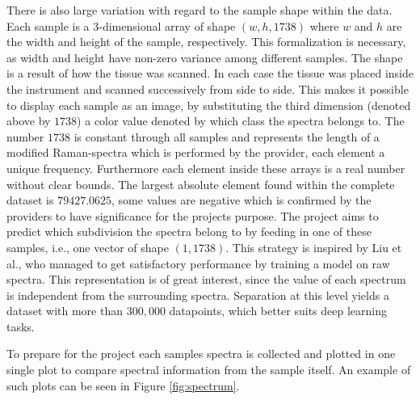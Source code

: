 There is also large variation with regard to the sample shape within the data. Each sample is a 3-dimensional array of shape $(w, h, 1738)$ where $w$ and $h$ are the width and height of the sample, respectively. This formalization is necessary, as width and height have non-zero variance among different samples. The shape is a result of how the tissue was scanned. In each case the tissue was placed inside the instrument and scanned successively from side to side. This makes it possible to display each sample as an image, by substituting the third dimension (denoted above by $1738$) a color value denoted by which class the spectra belongs to. The number $1738$ is constant through all samples and represents the length of a modified Raman-spectra which is performed by the provider, each element a unique frequency. Furthermore each element inside these arrays is a real number without clear bounds. The largest absolute element found within the complete dataset is $79427.0625$, some values are negative which is confirmed by the providers to have significance for the projects purpose. The project aims to predict which subdivision the spectra belong to by feeding in one of these samples, i.e., one vector of shape $(1, 1738)$. This strategy is inspired by Liu et al.\cite{liu2017deep}, who managed to get satisfactory performance by training a model on raw spectra. This representation is of great interest, since the value of each spectrum is independent from the surrounding spectra. Separation at this level yields a dataset with more than $300,000$ datapoints, which better suits deep learning tasks.

 
To prepare for the project each samples spectra is collected and plotted in one single plot to compare spectral information from the sample itself. An example of such plots can be seen in Figure \ref{fig:spectrum}.

